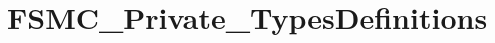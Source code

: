 \hypertarget{group___f_s_m_c___private___types_definitions}{\section{F\-S\-M\-C\-\_\-\-Private\-\_\-\-Types\-Definitions}
\label{group___f_s_m_c___private___types_definitions}
}

